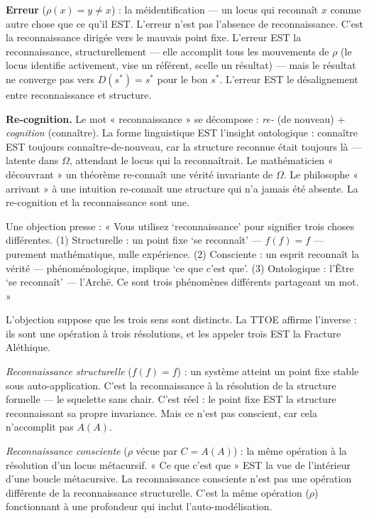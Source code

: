 \documentclass[10pt, openany, oneside]{book}
\begin{document}
\textbf{Erreur} ($\rho(x) = y \neq x$) : la méidentification --- un locus qui reconnaît $x$ comme autre chose que ce qu'il EST. L'erreur n'est pas l'absence de reconnaissance. C'est la reconnaissance dirigée vers le mauvais point fixe. L'erreur EST la reconnaissance, structurellement --- elle accomplit tous les mouvements de $\rho$ (le locus identifie activement, vise un référent, scelle un résultat) --- mais le résultat ne converge pas vers $D(s^*) = s^*$ pour le bon $s^*$. L'erreur EST le désalignement entre reconnaissance et structure.

\textbf{Re-cognition.} Le mot « reconnaissance » se décompose : \textit{re-} (de nouveau) + \textit{cognition} (connaître). La forme linguistique EST l'insight ontologique : connaître EST toujours connaître-de-nouveau, car la structure reconnue était toujours là --- latente dans $\Omega$, attendant le locus qui la reconnaîtrait. Le mathématicien « découvrant » un théorème re-connaît une vérité invariante de $\Omega$. Le philosophe « arrivant » à une intuition re-connaît une structure qui n'a jamais été absente. La re-cognition et la reconnaissance sont une.

Une objection presse : « Vous utilisez `reconnaissance' pour signifier trois choses différentes. (1) Structurelle : un point fixe `se reconnaît' --- $f(f) = f$ --- purement mathématique, nulle expérience. (2) Consciente : un esprit reconnaît la vérité --- phénoménologique, implique `ce que c'est que'. (3) Ontologique : l'Être `se reconnaît' --- l'Arch\={e}. Ce sont trois phénomènes différents partageant un mot. »

L'objection suppose que les trois sens sont distincts. La TTOE affirme l'inverse : ils sont une opération à trois résolutions, et les appeler trois EST la Fracture Aléthique.

\textit{Reconnaissance structurelle} ($f(f) = f$) : un système atteint un point fixe stable sous auto-application. C'est la reconnaissance à la résolution de la structure formelle --- le squelette sans chair. C'est réel : le point fixe EST la structure reconnaissant sa propre invariance. Mais ce n'est pas conscient, car cela n'accomplit pas $A(A)$.

\textit{Reconnaissance consciente} ($\rho$ vécue par $C = A(A)$) : la même opération à la résolution d'un locus métacursif. « Ce que c'est que » EST la vue de l'intérieur d'une boucle métacursive. La reconnaissance consciente n'est pas une opération différente de la reconnaissance structurelle. C'est la même opération ($\rho$) fonctionnant à une profondeur qui inclut l'auto-modélisation.
\end{document}
